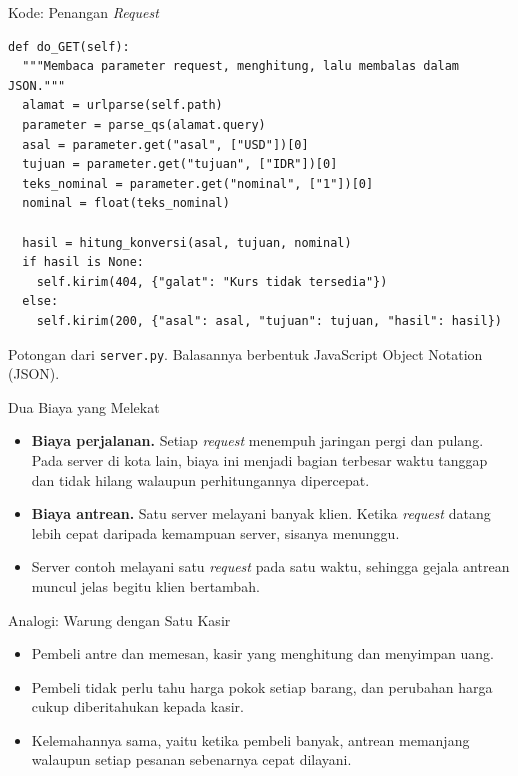 \documentclass[aspectratio=169, table, 12pt]{beamer}
\begin{document}
\begin{frame}[fragile]{{\Large Kode: Penangan \textit{Request}}}
  \vspace{2pt}
\begin{lstlisting}[style=PythonStyle]
def do_GET(self):
  """Membaca parameter request, menghitung, lalu membalas dalam JSON."""
  alamat = urlparse(self.path)
  parameter = parse_qs(alamat.query)
  asal = parameter.get("asal", ["USD"])[0]
  tujuan = parameter.get("tujuan", ["IDR"])[0]
  teks_nominal = parameter.get("nominal", ["1"])[0]
  nominal = float(teks_nominal)

  hasil = hitung_konversi(asal, tujuan, nominal)
  if hasil is None:
    self.kirim(404, {"galat": "Kurs tidak tersedia"})
  else:
    self.kirim(200, {"asal": asal, "tujuan": tujuan, "hasil": hasil})
\end{lstlisting}

  {\small Potongan dari \texttt{server.py}. Balasannya berbentuk JavaScript
  Object Notation (JSON).}
\end{frame}

\begin{frame}{{\Large Dua Biaya yang Melekat}}
  \vspace{8pt}
  \begin{itemize}\small
    \item \textbf{Biaya perjalanan.} Setiap \textit{request} menempuh jaringan
          pergi dan pulang. Pada server di kota lain, biaya ini menjadi bagian
          terbesar waktu tanggap dan tidak hilang walaupun perhitungannya
          dipercepat.
    \item \textbf{Biaya antrean.} Satu server melayani banyak klien. Ketika
          \textit{request} datang lebih cepat daripada kemampuan server, sisanya
          menunggu.
    \item Server contoh melayani satu \textit{request} pada satu waktu,
          sehingga gejala antrean muncul jelas begitu klien bertambah.
  \end{itemize}
\end{frame}

\begin{frame}{{\Large Analogi: Warung dengan Satu Kasir}}
  \vspace{8pt}
  \begin{itemize}\small
    \item Pembeli antre dan memesan, kasir yang menghitung dan menyimpan uang.
    \item Pembeli tidak perlu tahu harga pokok setiap barang, dan perubahan
          harga cukup diberitahukan kepada kasir.
    \item Kelemahannya sama, yaitu ketika pembeli banyak, antrean memanjang
          walaupun setiap pesanan sebenarnya cepat dilayani.
  \end{itemize}
\end{frame}
\end{document}
